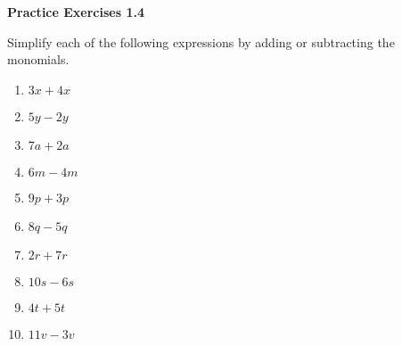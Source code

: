 
\noindent\textbf{Practice Exercises 1.4}



Simplify each of the following expressions by adding or subtracting the monomials.



\begin{enumerate}
    \item \( 3x + 4x \)
    \item \( 5y - 2y \)
    \item \( 7a + 2a \)
    \item \( 6m - 4m \)
    \item \( 9p + 3p \)
    \item \( 8q - 5q \)
    \item \( 2r + 7r \)
    \item \( 10s - 6s \)
    \item \( 4t + 5t \)
    \item \( 11v - 3v \)
\end{enumerate}
